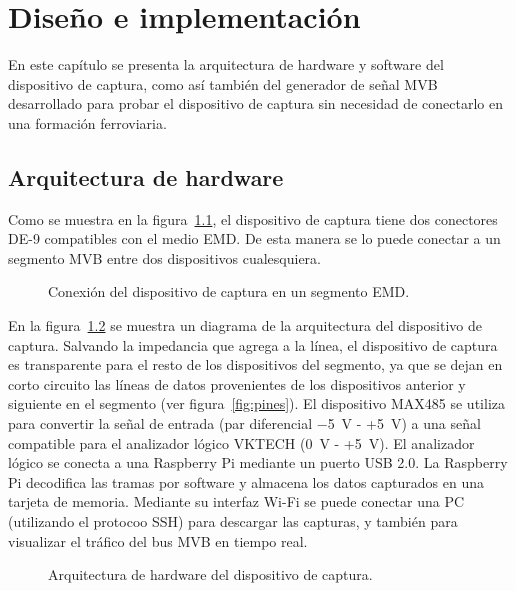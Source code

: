 \chapter{Diseño e implementación}
\label{cap:DisenioImplementacion}

En este capítulo se presenta la arquitectura de hardware y software del dispositivo de captura, como así también del generador de señal MVB desarrollado para probar el dispositivo de captura sin necesidad de conectarlo en una formación ferroviaria.

\section{Arquitectura de hardware}
\label{sec:hardware}

Como se muestra en la figura~\ref{fig:conexion}, el dispositivo de captura tiene dos conectores DE-9 compatibles con el medio EMD. De esta manera se lo puede conectar a un segmento MVB entre dos dispositivos cualesquiera.

\begin{figure}[htbp]
	\centering
    {
        \fontsize{8pt}{8pt}\selectfont
        
    }
	\caption{Conexión del dispositivo de captura en un segmento EMD.}
    \label{fig:conexion}
\end{figure}

En la figura~\ref{fig:bloques} se muestra un diagrama de la arquitectura del dispositivo de captura.
Salvando la impedancia que agrega a la línea, el dispositivo de captura es transparente para el resto de los dispositivos del segmento, ya que se dejan en corto circuito las líneas de datos provenientes de los dispositivos anterior y siguiente en el segmento (ver figura~\ref{fig:pines}).
El dispositivo MAX485 \cite{max485} se utiliza para convertir la señal de entrada (par diferencial $-$5~V - +5~V) a una señal compatible para el analizador lógico VKTECH (0~V - +5~V). El analizador lógico se conecta a una Raspberry Pi mediante un puerto USB 2.0. La Raspberry Pi decodifica las tramas por software y almacena los datos capturados en una tarjeta de memoria. Mediante su interfaz Wi-Fi se puede conectar una PC (utilizando el protocoo SSH) para descargar las capturas, y también para visualizar el tráfico del bus MVB en tiempo real.

\begin{figure}[htbp]
	\centering
    {
        \fontsize{8pt}{8pt}\selectfont
        
    }
	\caption{Arquitectura de hardware del dispositivo de captura.}
    \label{fig:bloques}
\end{figure}

